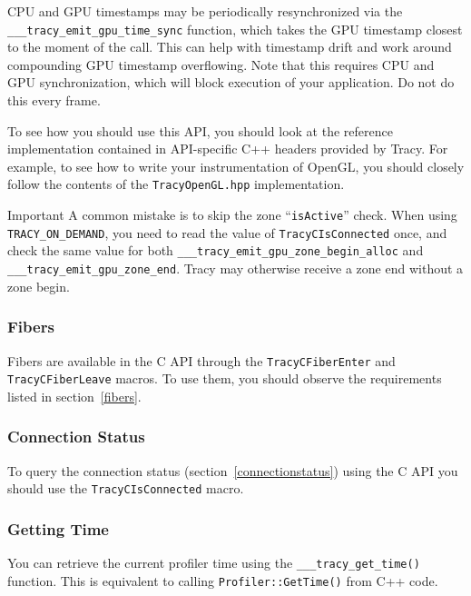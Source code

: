 \documentclass[hidelinks,titlepage,a4paper,twoside]{article}
\begin{document}
CPU and GPU timestamps may be periodically resynchronized via the \texttt{\_\_\_tracy\_emit\_gpu\_time\_sync} function, which takes the GPU timestamp closest to the moment of the call. This can help with timestamp drift and work around compounding GPU timestamp overflowing. Note that this requires CPU and GPU synchronization, which will block execution of your application. Do not do this every frame.

To see how you should use this API, you should look at the reference implementation contained in API-specific C++ headers provided by Tracy. For example, to see how to write your instrumentation of OpenGL, you should closely follow the contents of the \texttt{TracyOpenGL.hpp} implementation.


\begin{bclogo}[
	noborder=true,
	couleur=black!5,
	logo=\bcbombe
	]{Important}
A common mistake is to skip the zone \enquote{\texttt{isActive}} check. When using \texttt{TRACY\_ON\_DEMAND}, you need to read the value of \texttt{TracyCIsConnected} once, and check the same value for both \newline \texttt{\_\_\_tracy\_emit\_gpu\_zone\_begin\_alloc} and \texttt{\_\_\_tracy\_emit\_gpu\_zone\_end}. Tracy may otherwise receive a zone end without a zone begin.
\end{bclogo}

\subsubsection{Fibers}

Fibers are available in the C API through the \texttt{TracyCFiberEnter} and \texttt{TracyCFiberLeave} macros. To use them, you should observe the requirements listed in section~\ref{fibers}.

\subsubsection{Connection Status}

To query the connection status (section~\ref{connectionstatus}) using the C API you should use the \texttt{TracyCIsConnected} macro.

\subsubsection{Getting Time}

You can retrieve the current profiler time using the \texttt{\_\_\_tracy\_get\_time()} function. This is equivalent to calling \texttt{Profiler::GetTime()} from C++ code.
\end{document}
